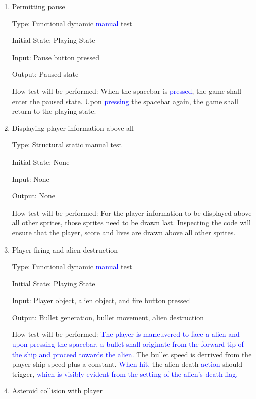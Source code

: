 \documentclass[12pt, titlepage]{article}
\begin{document}
\begin{enumerate}

\item{Permitting pause\\}

Type: Functional dynamic \textcolor{blue}{manual} test

Initial State: Playing State

Input: Pause button pressed

Output: Paused state

How test will be performed: When the spacebar is \textcolor{blue}{pressed}, the game shall enter the paused state. Upon \textcolor{blue}{pressing} the spacebar again, the game shall return to the playing state.

\item{Displaying player information above all\\}

Type: Structural static manual test

Initial State: None

Input: None

Output: None

How test will be performed: For the player information to be displayed above all other sprites, those sprites need to be drawn last. Inspecting the code will ensure that the player, score and lives are drawn above all other sprites.

\item{Player firing and alien destruction\\}

Type: Functional dynamic \textcolor{blue}{manual} test

Initial State: Playing State

Input: Player object, alien object, and fire button pressed

Output: Bullet generation, bullet movement, alien destruction

How test will be performed: \textcolor{blue}{The player is maneuvered to face a alien and upon pressing the spacebar, a bullet shall originate from the forward tip of the ship and proceed towards the alien.} The bullet speed is derrived from the player ship speed plus a constant. \textcolor{blue}{When hit,} the alien death \textcolor{blue}{action} should trigger, \textcolor{blue}{which is visibly evident from the setting of the alien's death flag.}

\item{Asteroid collision with player\\}


\end{enumerate}
\end{document}
